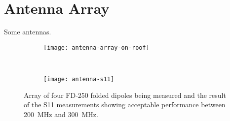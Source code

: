 \section{Antenna Array}

Some antennas.

\begin{figure}
  \begin{subfigure}{\textwidth}
    \centering
    \texttt{[image: antenna-array-on-roof]}
  \end{subfigure}\\[1em]
  \begin{subfigure}{\textwidth}
    \centering
    \texttt{[image: antenna-s11]}
  \end{subfigure}
  \caption{Array of four FD-250 folded dipoles being measured and the result of the S11 measurements showing acceptable performance between \SI{200}{\mega\hertz} and \SI{300}{\mega\hertz}.}
\end{figure}
